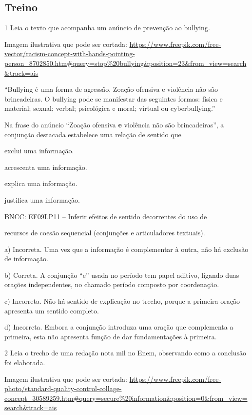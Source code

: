 {\begin{itemize}
\section{Treino}

\num{1} Leia o texto que acompanha um anúncio de prevenção ao bullying.

Imagem ilustrativa que pode ser cortada:
\url{https://www.freepik.com/free-vector/racism-concept-with-hands-pointing-person_8702850.htm\#query=stop\%20bullying\&position=23\&from_view=search\&track=ais}

``Bullying é uma forma de agressão. Zoação ofensiva e violência não são
brincadeiras. O bullying pode se manifestar das seguintes formas: física
e material; sexual; verbal; psicológica e moral; virtual ou
cyberbullying.''

Na frase do anúncio ``Zoação ofensiva \textbf{e} violência não são
brincadeiras'', a conjunção destacada estabelece uma relação de sentido
que

\begin{escolha}
\item exclui uma informação.

\item acrescenta uma informação.

\item explica uma informação.

\item justifica uma informação.

\end{escolha}BNCC: EF09LP11 -- Inferir efeitos de sentido decorrentes do uso de

recursos de coesão sequencial (conjunções e articuladores textuais).

a) Incorreta. Uma vez que a informação é complementar à outra, não há
exclusão de informação.

b) Correta. A conjunção ``e'' usada no período tem papel aditivo,
ligando duas orações independentes, no chamado período composto por
coordenação.

c) Incorreta. Não há sentido de explicação no trecho, porque a primeira
oração apresenta um sentido completo.

d) Incorreta. Embora a conjunção introduza uma oração que complementa a
primeira, esta não apresenta função de dar fundamentações à primeira.

\num{2} Leia o trecho de uma redação nota mil no Enem, observando como a
conclusão foi elaborada.

Imagem ilustrativa que pode ser cortada:
\url{https://www.freepik.com/free-photo/standard-quality-control-collage-concept_30589259.htm\#query=secure\%20information\&position=0\&from_view=search\&track=ais}


\end{itemize}}

